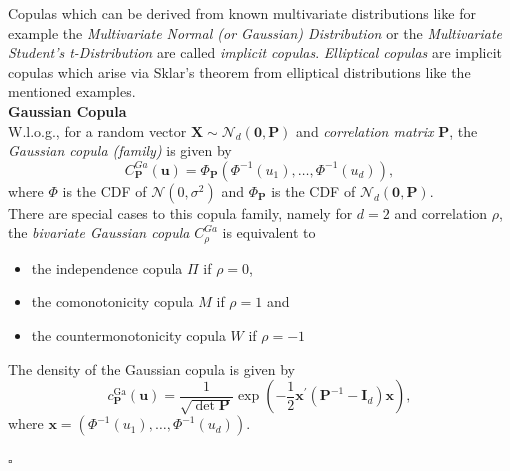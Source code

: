 
Copulas which can be derived from known multivariate distributions like for example the \textit{Multivariate Normal (or Gaussian) Distribution} or the \textit{Multivariate Student's t-Distribution} are called \textit{implicit copulas}. \textit{Elliptical copulas} are implicit copulas which arise via Sklar's theorem from elliptical distributions like the mentioned examples.\\

\textbf{Gaussian Copula}\\
W.l.o.g., for a random vector $\bm{X} \sim {\mathcal{N}_{d}(\bm{0}, \mathbf{P})} $ and \textit{correlation matrix} $\bm{P}$,
the \textit{Gaussian copula (family)} is given by
\begin{equation}
C_{\mathbf{P}}^{G a}(\mathbf{u})=\Phi_{\mathbf{P}}\left(\Phi^{-1}\left(u_{1}\right), \ldots, \Phi^{-1}\left(u_{d}\right)\right),
\end{equation}
where $\Phi$ is the \ac{CDF} of $\mathcal{N}(0, \sigma^{2})$ and 
$\Phi_{\bm{P}}$ is the \ac{CDF} of $\mathcal{N}_{d}(\bm{0}, \mathbf{P})$.\\
There are special cases to this copula family, namely for $d=2$ and correlation $\rho$, the \textit{bivariate Gaussian copula} $C_{\rho}^{G a}$ is equivalent to
\begin{itemize}
\item the independence copula $\Pi$ if $\rho = 0$,
\item the comonotonicity copula $M$ if $\rho = 1$ and
\item the countermonotonicity copula $W$ if $\rho = -1$
\end{itemize}
The density of the Gaussian copula is given by
\begin{equation}
c_{\bm{P}}^{\mathrm{Ga}}(\boldsymbol{u})=\frac{1}{\sqrt{\operatorname{det} \bm{P}}} \exp \left(-\frac{1}{2} \boldsymbol{x}^{\prime}\left(\bm{P}^{-1}-\bm{I}_{d}\right) \boldsymbol{x}\right),
\end{equation}
where $\bm{x} = \left(\Phi^{-1}\left(u_{1}\right), \ldots, \Phi^{-1}\left(u_{d}\right)\right)$.

\hfill $\square$ \\




